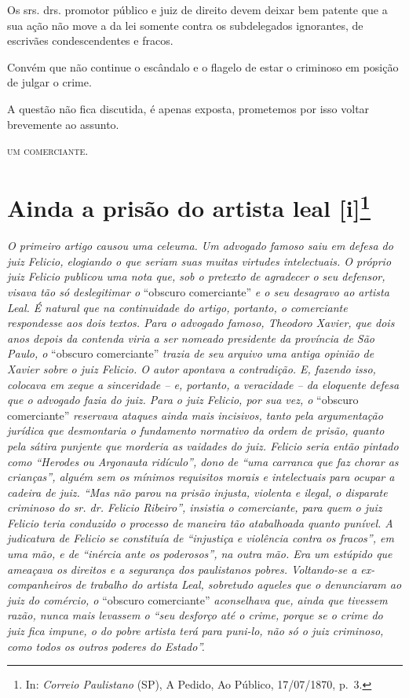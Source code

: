 Os srs. drs. promotor público e juiz de direito devem deixar bem patente
que a sua ação não move a da lei somente contra os subdelegados
ignorantes, de escrivães condescendentes e fracos.

Convém que não continue o escândalo e o flagelo de estar o criminoso em
posição de julgar o crime.

A questão não fica discutida, é apenas exposta, prometemos por isso
voltar brevemente ao assunto.
\begin{flushright}
\textsc{um comerciante}.
\end{flushright}
\chapter{Ainda a prisão do artista leal {[}i{]}\footnote{ In: \emph{Correio Paulistano} (SP), A Pedido, Ao Público,
  17/07/1870, p.~3.}} %

\begin{didascalia}
\emph{O primeiro artigo causou uma celeuma. Um advogado famoso saiu em
defesa do juiz Felicio, elogiando o que seriam suas muitas virtudes
intelectuais. O próprio juiz Felicio publicou uma nota que, sob o
pretexto de agradecer o seu defensor, visava tão só deslegitimar o}
``obscuro comerciante'' \emph{e o seu desagravo ao artista Leal. É natural
que na continuidade do artigo, portanto, o comerciante respondesse aos
dois textos. Para o advogado famoso, Theodoro Xavier, que dois anos
depois da contenda viria a ser nomeado presidente da província de São
Paulo, o} ``obscuro comerciante'' \emph{trazia de seu arquivo uma antiga
opinião de Xavier sobre o juiz Felicio. O autor apontava a contradição.
E, fazendo isso, colocava em xeque a sinceridade -- e, portanto, a
veracidade -- da eloquente defesa que o advogado fazia do juiz. Para o
juiz Felicio, por sua vez, o} ``obscuro comerciante'' \emph{reservava
ataques ainda mais incisivos, tanto pela argumentação jurídica que
desmontaria o fundamento normativo da ordem de prisão, quanto pela
sátira punjente que morderia as vaidades do juiz. Felicio seria então
pintado como ``Herodes ou Argonauta ridículo'', dono de ``uma carranca que
faz chorar as crianças'', alguém sem os mínimos requisitos morais e
intelectuais para ocupar a cadeira de juiz. ``Mas não parou na prisão
injusta, violenta e ilegal, o disparate criminoso do sr. dr. Felicio
Ribeiro'', insistia o comerciante, para quem o juiz Felicio teria
conduzido o processo de maneira tão atabalhoada quanto punível. A
judicatura de Felicio se constituía de ``injustiça e violência contra os
fracos'', em uma mão, e de ``inércia ante os poderosos'', na outra mão. Era
um estúpido que ameaçava os direitos e a segurança dos paulistanos
pobres. Voltando-se a ex-companheiros de trabalho do artista Leal,
sobretudo aqueles que o denunciaram ao juiz do comércio, o} ``obscuro
comerciante'' \emph{aconselhava que, ainda que tivessem razão, nunca mais
levassem o ``seu desforço até o crime, porque se o crime do juiz fica
impune, o do pobre artista terá para puni-lo, não só o juiz criminoso,
como todos os outros poderes do Estado''.}
\end{didascalia}

